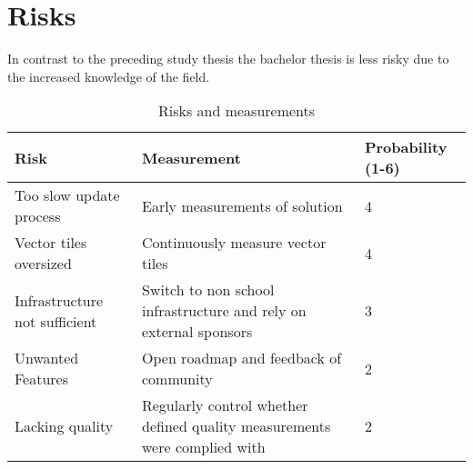 \section{Risks}\label{risks}

In contrast to the preceding study thesis the bachelor thesis is less risky due
to the increased knowledge of the field.

\begin{table}[H]
\centering
    \begin{tabular}{p{4.5cm} p{7.5cm} p{1.8cm}}
    \hline
    Risk & Measurement & Probability (1-6)\\
    \hline
    Too slow update process& Early measurements of solution & 4\\
    Vector tiles oversized & Continuously measure vector tiles & 4\\
    Infrastructure not sufficient & Switch to non school infrastructure and rely on external sponsors & 3\\
    Unwanted Features & Open roadmap and feedback of community & 2\\
    Lacking quality & Regularly control whether defined quality measurements were complied with & 2\\
    \end{tabular}
    \caption{Risks and measurements}
\end{table}
